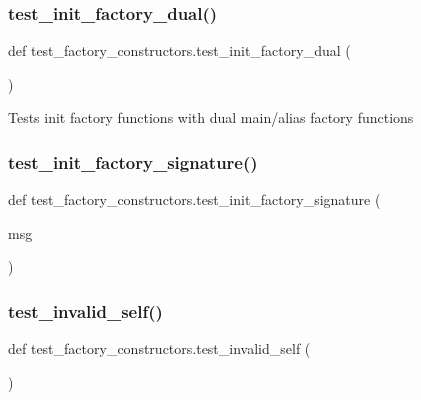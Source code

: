 \subsubsection{\texorpdfstring{test\_init\_factory\_dual()}{test\_init\_factory\_dual()}}
{\footnotesize\ttfamily def test\+\_\+factory\+\_\+constructors.\+test\+\_\+init\+\_\+factory\+\_\+dual (\begin{DoxyParamCaption}{ }\end{DoxyParamCaption})}

\begin{DoxyVerb}Tests init factory functions with dual main/alias factory functions\end{DoxyVerb}
 \mbox{\label{namespacetest__factory__constructors_a563534f0b537f502108400846e601e7e}} 
\subsubsection{\texorpdfstring{test\_init\_factory\_signature()}{test\_init\_factory\_signature()}}
{\footnotesize\ttfamily def test\+\_\+factory\+\_\+constructors.\+test\+\_\+init\+\_\+factory\+\_\+signature (\begin{DoxyParamCaption}\item[{}]{msg }\end{DoxyParamCaption})}

\mbox{\label{namespacetest__factory__constructors_af2f4c9d56a0e09246564df1471ca3971}} 
\subsubsection{\texorpdfstring{test\_invalid\_self()}{test\_invalid\_self()}}
{\footnotesize\ttfamily def test\+\_\+factory\+\_\+constructors.\+test\+\_\+invalid\+\_\+self (\begin{DoxyParamCaption}{ }\end{DoxyParamCaption})}

